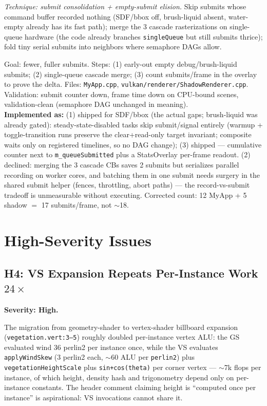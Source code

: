 \documentclass[11pt,a4paper]{article}
\begin{document}
\textit{Technique: submit consolidation + empty-submit elision.} Skip submits
whose command buffer recorded nothing (SDF/bbox off, brush-liquid absent,
water-empty already has its fast path); merge the 3 cascade rasterizations
on single-queue hardware (the code already branches
\texttt{singleQueue} but still submits thrice); fold tiny serial submits
into neighbors where semaphore DAGs allow.

\begin{tcolorbox}[promptbox={Prompt --- C3: consolidate frame submits}]
Goal: fewer, fuller submits. Steps: (1) early-out empty debug/brush-liquid
submits; (2) single-queue cascade merge; (3) count submits/frame in the
overlay to prove the delta. Files: \texttt{MyApp.cpp},
\texttt{vulkan/renderer/ShadowRenderer.cpp}. Validation: submit counter
down, frame time down on CPU-bound scenes, validation-clean (semaphore DAG
unchanged in meaning).
\\ \textbf{Implemented as:} (1) shipped for SDF/bbox (the actual gaps;
brush-liquid was already gated): steady-state-disabled tasks skip
submit/signal entirely (warmup + toggle-transition runs preserve the
clear+read-only target invariant; composite waits only on registered
timelines, so no DAG change); (3) shipped --- cumulative counter next to
\texttt{m\_queueSubmitted} plus a StatsOverlay per-frame readout. (2)
declined: merging the 3 cascade CBs saves 2 submits but serializes
parallel recording on worker cores, and batching them in one submit needs
surgery in the shared submit helper (fences, throttling, abort paths) ---
the record-vs-submit tradeoff is unmeasurable without executing. Corrected
count: 12 MyApp + 5 shadow $=$ 17 submits/frame, not $\sim$18.
\end{tcolorbox}

\section{High-Severity Issues}

\subsection{H4: VS Expansion Repeats Per-Instance Work $24\times$}
\label{sec:h4}

\textbf{Severity: High.}

The migration from geometry-shader to vertex-shader billboard expansion
(\texttt{vegetation.vert:3--5}) roughly doubled per-instance vertex ALU: the
GS evaluated wind 36 perlin2 per instance once, while the VS evaluates
\texttt{applyWindSkew} (3 perlin2 each, $\sim$60 ALU per \texttt{perlin2})
plus \texttt{vegetationHeightScale} plus \texttt{sin+cos(theta)} per corner
vertex --- $\sim$7k flops per instance, of which height, density hash and
trigonometry depend only on per-instance constants. The header comment
claiming height is ``computed once per instance'' is aspirational: VS
invocations cannot share it.
\end{document}
